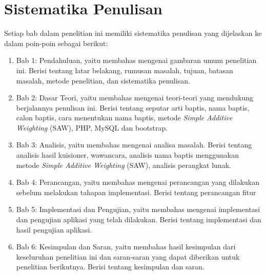 \section{Sistematika Penulisan}
\label{sec:sistematika_penulisan}
Setiap bab dalam penelitian ini memiliki sistematika penulisan yang dijelaskan ke dalam poin-poin sebagai berikut:
	\begin{enumerate}
		\item Bab 1: Pendahuluan, yaitu membahas mengenai gambaran umum penelitian ini. Berisi tentang latar belakang, rumusan masalah, tujuan, batasan masalah, metode penelitian, dan sistematika penulisan.
		\item Bab 2: Dasar Teori, yaitu membahas mengenai teori-teori yang mendukung berjalannya penulisan ini. Berisi tentang seputar arti baptis, nama baptis, calon baptis, cara menentukan nama baptis, metode \textit{Simple Additive Weighting} (SAW), PHP, MySQL dan bootstrap.
		\item Bab 3: Analisis, yaitu membahas mengenai analisa masalah. Berisi tentang analisis hasil kuisioner, wawancara, analisis nama baptis menggunakan metode \textit{Simple Additive Weighting} (SAW), analisis perangkat lunak.
		\item Bab 4: Perancangan, yaitu membahas mengenai perancangan yang dilakukan sebelum melakukan tahapan implementasi. Berisi tentang perancangan fitur %
		\item Bab 5: Implementasi dan Pengujian, yaitu membahas mengenai implementasi dan pengujian aplikasi yang telah dilakukan. Berisi tentang implementasi dan hasil pengujian aplikasi.
		\item Bab 6: Kesimpulan dan Saran, yaitu membahas hasil kesimpulan dari keseluruhan penelitian ini dan saran-saran yang dapat
diberikan untuk penelitian berikutnya. Berisi tentang kesimpulan dan saran.
	\end{enumerate}